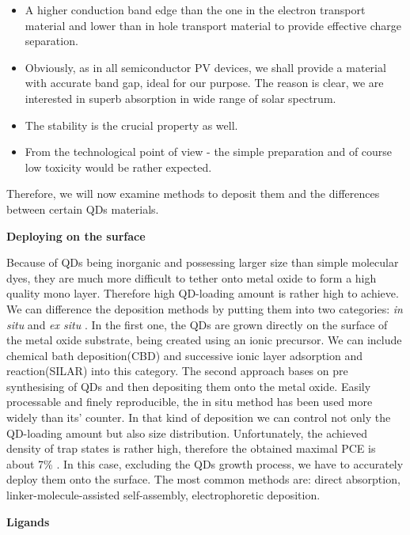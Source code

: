 \begin{enumerate}
\begin{itemize}
\item
  A higher conduction band edge than the one in the electron transport material and lower than in hole transport material to provide effective charge separation.
\item
  Obviously, as in all semiconductor PV devices, we shall provide a
  material with accurate band gap, ideal for our purpose. The reason is
  clear, we are interested in superb absorption in wide range of solar
  spectrum.
\item
  The stability is the crucial property as well.
\item
  From the technological point of view - the simple preparation and of
  course low toxicity would be rather expected.
\end{itemize}
Therefore, we will now examine methods to deposit them and the
differences between certain QDs materials.

\textbf{Deploying on the surface}

Because of QDs being inorganic and possessing larger size than simple
molecular dyes, they are much more difficult to tether onto metal oxide
to form a high quality mono layer. Therefore high QD-loading amount is
rather high to achieve. We can difference the deposition methods by
putting them into two categories: \emph{in situ} and \emph{ex situ} . In
the first one, the QDs are grown directly on the surface of the metal
oxide substrate, being created using an ionic precursor. We can include
chemical bath deposition(CBD) and successive ionic layer adsorption and
reaction(SILAR) into this category. The second approach bases on pre
synthesising of QDs and then depositing them onto the metal oxide.
Easily processable and finely reproducible, the in situ method has been
used more widely than its' counter. In that kind of deposition we can control not only the QD-loading amount but also size distribution.
Unfortunately, the achieved density of trap states is rather high, therefore the obtained maximal PCE is about 7\% \cite{L.Lv2014} . In this case, excluding the QDs growth process, we have to accurately deploy them onto the surface. The most common methods are: direct absorption, linker-molecule-assisted self-assembly, electrophoretic deposition. \cite{HuashangRao2018}

\textbf{Ligands}


\end{enumerate}
